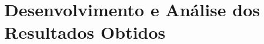 \chapter{Desenvolvimento e Análise dos Resultados Obtidos}\label{cap:desenvolvimento_e_analise_resultados}





